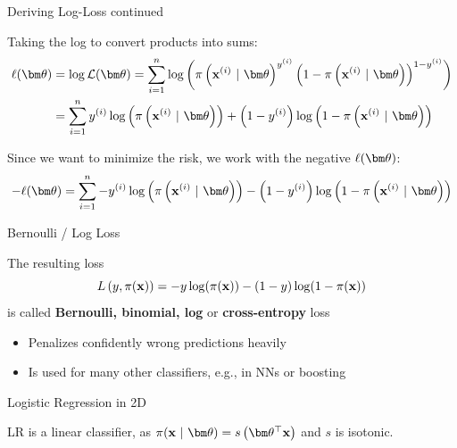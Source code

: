 \documentclass[11pt,compress,t,notes=noshow, xcolor=table]{beamer}
\begin{document}
\begin{vbframe}{Deriving Log-Loss continued}

Taking the log to convert products into sums:
\begin{align*}
\loglt &= \log \LLt = 
\sumin \log\left(\pixit^{\yi} \left(1-\pixit\right)^{1-\yi}\right) \\
       &= \sumin \yi \log\left(\pixit\right) + \left(1-\yi\right)\log\left(1-\pixit\right)
\end{align*}

Since we want to minimize the risk, we work with the negative $\loglt$:
$$
- \loglt = \sumin - \yi \log\left(\pixit\right) - \left(1-\yi\right)\log\left(1-\pixit\right)
$$


\end{vbframe}

\begin{vbframe}{Bernoulli / Log Loss}

The resulting loss 
$$L\left(y, \pi(\mathbf{x})\right) = -y\log(\pi(\mathbf{x}))-(1-y)\log(1-\pi(\mathbf{x}))$$ 
is called \textbf{Bernoulli, binomial, log} or \textbf{cross-entropy} loss

\lz


\lz

\begin{itemize}
  \item Penalizes confidently wrong predictions heavily
  \item Is used for many other classifiers, e.g., in NNs or boosting 


  
\end{itemize}


\end{vbframe}


\begin{vbframe}{Logistic Regression in 2D}

LR is a linear classifier, as $\pixt = s\left( \thx \right)$ 
and $s$ is isotonic.

\lz\lz


\end{vbframe}
\end{document}
